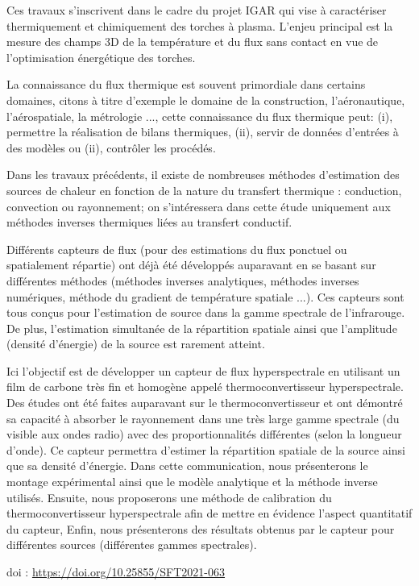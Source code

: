 {\normalsize
Ces travaux s'inscrivent dans le cadre du projet IGAR qui vise à caractériser thermiquement et chimiquement des torches à plasma. L'enjeu principal est la mesure des champs 3D de la température et du flux sans contact en vue de l'optimisation énergétique des torches.







La connaissance du flux thermique est souvent primordiale dans certains domaines, citons à titre d'exemple le domaine de la construction, l'aéronautique, l'aérospatiale, la métrologie ..., cette connaissance du flux thermique peut: (i), permettre la réalisation de bilans thermiques, (ii), servir de données d'entrées à des modèles ou (ii), contrôler les procédés.







Dans les travaux précédents, il existe de nombreuses méthodes d'estimation des sources de chaleur en fonction de la nature du transfert thermique : conduction, convection ou rayonnement; on s'intéressera dans cette étude uniquement aux méthodes inverses thermiques liées au transfert conductif.







Différents capteurs de flux (pour des estimations du flux ponctuel ou spatialement répartie) ont déjà été développés auparavant en se basant sur différentes méthodes (méthodes inverses analytiques, méthodes inverses numériques, méthode du gradient de température spatiale ...). Ces capteurs sont tous conçus pour l'estimation de source dans la gamme spectrale de l'infrarouge. De plus, l'estimation simultanée de la répartition spatiale ainsi que l'amplitude (densité d'énergie) de la source est rarement atteint. 







Ici l'objectif est de développer un capteur de flux hyperspectrale en utilisant un film  de carbone très fin et homogène appelé thermoconvertisseur hyperspectrale. Des études ont été faites auparavant sur le thermoconvertisseur et ont démontré sa capacité à absorber le rayonnement dans une très large gamme spectrale (du visible aux ondes radio) avec des proportionnalités différentes (selon la longueur d'onde). Ce capteur permettra d'estimer la répartition spatiale de la source ainsi que sa densité d'énergie. Dans cette communication, nous présenterons le montage expérimental ainsi que le modèle analytique et la méthode inverse utilisés. Ensuite, nous proposerons une méthode de calibration du thermoconvertisseur hyperspectrale afin de mettre en évidence l'aspect quantitatif du capteur, Enfin, nous présenterons des résultats obtenus par le capteur pour différentes sources (différentes gammes spectrales).

 \vfill doi : \url{https://doi.org/10.25855/SFT2021-063}

}
 
